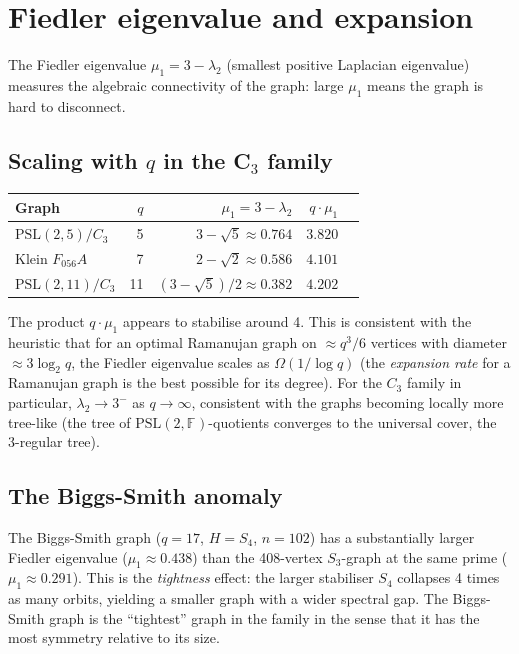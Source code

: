 \documentclass[11pt,a4paper]{amsart}
\theoremstyle{definition}
\theoremstyle{remark}
\newcommand{\PSL}[1]{\mathrm{PSL}(2,\mathbb{F}_{#1})}
\begin{document}
\section{Fiedler eigenvalue and expansion}\label{sec:fiedler}

The Fiedler eigenvalue $\mu_1 = 3 - \lambda_2$ (smallest positive Laplacian
eigenvalue) measures the algebraic connectivity of the graph: large $\mu_1$
means the graph is hard to disconnect.

\subsection{Scaling with $q$ in the C$_3$ family}

\begin{center}
\begin{tabular}{lrrrr}
\toprule
Graph & $q$ & $\mu_1 = 3-\lambda_2$ & $q\cdot\mu_1$ \\
\midrule
$\mathrm{PSL}(2,5)/C_3$ & 5 & $3-\sqrt{5} \approx 0.764$ & $3.820$ \\
Klein $F_{056}A$ & 7 & $2-\sqrt{2} \approx 0.586$ & $4.101$ \\
$\mathrm{PSL}(2,11)/C_3$ & 11 & $(3-\sqrt{5})/2 \approx 0.382$ & $4.202$ \\
\bottomrule
\end{tabular}
\end{center}

\noindent
The product $q \cdot \mu_1$ appears to stabilise around 4.  This is consistent
with the heuristic that for an optimal Ramanujan graph on $\approx q^3/6$
vertices with diameter $\approx 3\log_2 q$, the Fiedler eigenvalue scales as
$\Omega(1/\log q)$ (the \emph{expansion rate} for a Ramanujan graph is the
best possible for its degree).  For the $C_3$ family in particular,
$\lambda_2 \to 3^-$ as $q\to\infty$, consistent with the graphs becoming
locally more tree-like (the tree of $\PSL{}$-quotients converges to the
universal cover, the 3-regular tree).

\subsection{The Biggs-Smith anomaly}

The Biggs-Smith graph ($q=17$, $H=S_4$, $n=102$) has a substantially larger
Fiedler eigenvalue ($\mu_1 \approx 0.438$) than the 408-vertex $S_3$-graph at
the same prime ($\mu_1 \approx 0.291$).  This is the \emph{tightness} effect:
the larger stabiliser $S_4$ collapses 4 times as many orbits, yielding a
smaller graph with a wider spectral gap.  The Biggs-Smith graph is the
``tightest'' graph in the family in the sense that it has the most symmetry
relative to its size.
\end{document}
